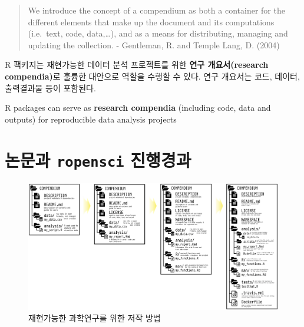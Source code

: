 \documentclass[
  letterpaper,
  chapter,a4paper,showtrims,openright,hidelinks]{oblivoir}
\begin{document}
\begin{quote}
We introduce the concept of a compendium as both a container for the
different elements that make up the document and its computations
(i.e.~text, code, data,\ldots), and as a means for distributing,
managing and updating the collection. - Gentleman, R. and Temple Lang,
D. (2004)
\end{quote}

\begin{tcolorbox}[enhanced jigsaw, leftrule=.75mm, toptitle=1mm, opacitybacktitle=0.6, rightrule=.15mm, toprule=.15mm, colbacktitle=quarto-callout-note-color!10!white, titlerule=0mm, left=2mm, arc=.35mm, bottomtitle=1mm, coltitle=black, title=\textcolor{quarto-callout-note-color}{\faInfo}\hspace{0.5em}{노트}, opacityback=0, colframe=quarto-callout-note-color-frame, breakable, bottomrule=.15mm, colback=white]

R 팩키지는 재현가능한 데이터 분석 프로젝트를 위한 \textbf{연구
개요서(research compendia)}로 훌륭한 대안으로 역할을 수행할 수 있다.
연구 개요서는 코드, 데이터, 출력결과물 등이 포함된다.

R packages can serve as \textbf{research compendia} (including code,
data and outputs) for reproducible data analysis projects

\end{tcolorbox}

\hypertarget{papers-ropensci}{%
\section{\texorpdfstring{논문과 \texttt{ropensci}
진행경과}{논문과 ropensci 진행경과}}\label{papers-ropensci}}

\autocite{marwick2018packaging}

\begin{figure}

{\centering \includegraphics{images/compendium-rrtools.png}

}

\caption{재현가능한 과학연구를 위한 저작 방법}

\end{figure}
\end{document}
